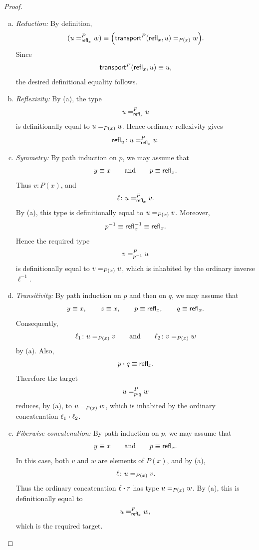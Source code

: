 \begin{proof}\ 
    \begin{enumerate}[a),font=\upshape]
        \item \emph{Reduction:}
        By definition,
        \[
            (u=_{\mathsf{refl}_x}^{P}w)
            \equiv
            \Bigl(
                \mathsf{transport}^P(\mathsf{refl}_x,u)
                \mathrel{=_{P(x)}}w
            \Bigr).
        \]
        Since
        \[
            \mathsf{transport}^P(\mathsf{refl}_x,u)\equiv u,
        \]
        the desired definitional equality follows.

        \item \emph{Reflexivity:}
        By (a), the type
        \[
            u=_{\mathsf{refl}_x}^{P}u
        \]
        is definitionally equal to\/ $u\mathrel{=_{P(x)}}u$. Hence ordinary reflexivity gives
        \[
            \fun{refl}_u\colon u\eqt{\fun{refl}_x}{P}u.
        \]

        \item \emph{Symmetry:}
        By path induction on\/ $p$, we may assume that
        \[
            y\equiv x
            \qquad\text{and}\qquad
            p\equiv\mathsf{refl}_x.
        \]
        Thus\/ $v\colon P(x)$, and\/
        \[
            \ell\colon u\eqt{\fun{refl}_x}{P}v.
        \]
        By (a), this type is definitionally equal to\/ $u\mathrel{=_{P(x)}}v$. Moreover,
        \[
            p^{-1}\equiv\mathsf{refl}_x^{-1}\equiv\mathsf{refl}_x.
        \]
        Hence the required type
        \[
            v=_{p^{-1}}^{P}u
        \]
        is definitionally equal to\/ $v\mathrel{=_{P(x)}}u$, which is inhabited by the ordinary inverse\/ $\ell^{-1}$.

        \item \emph{Transitivity:}
        By path induction on\/ $p$ and then on\/ $q$, we may assume that
        \[
            y\equiv x,\qquad z\equiv x,\qquad
            p\equiv\mathsf{refl}_x,\qquad
            q\equiv\mathsf{refl}_x.
        \]
        Consequently,
        \[
            \ell_1\colon u\eq{P(x)}v
            \qquad\text{and}\qquad
            \ell_2\colon v\eq{P(x)}w
        \]
        by (a). Also,
        \[
            p\mathbin{\boldsymbol{\cdot}} q\equiv\mathsf{refl}_x.
        \]
        Therefore the target
        \[
            u=_{p\mathbin{\boldsymbol{\cdot}} q}^{P}w
        \]
        reduces, by (a), to\/ $u\mathrel{=_{P(x)}}w$, which is inhabited by the ordinary concatenation\/ $\ell_1\mathbin{\boldsymbol{\cdot}}\ell_2$.

        \item \emph{Fiberwise concatenation:}
        By path induction on\/ $p$, we may assume that
        \[
            y\equiv x
            \qquad\text{and}\qquad
            p\equiv\mathsf{refl}_x.
        \]
        In this case, both\/ $v$ and\/ $w$ are elements of\/ $P(x)$, and by (a),
        \[
            \ell\colon u\eq{P(x)}v.
        \]
        Thus\/ the ordinary concatenation\/ $\ell\mathbin{\boldsymbol{\cdot}} r$ has type\/ $u\mathrel{=_{P(x)}}w$. By (a), this is definitionally equal to
        \[
            u=_{\mathsf{refl}_x}^{P}w,
        \]
        which is the required target.
    \end{enumerate}
\end{proof}

